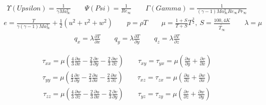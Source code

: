 \begin{align*}
\Upsilon (Upsilon)=\frac{1}{\gamma Ma_\infty^2}
\ \ \ \ \ \ \ \ \ 
\Psi (Psi)=\frac{1}{Re_\infty}
\ \ \ \ \ \ \ \ \ 
\Gamma (Gamma)=\frac{1}{\left(\gamma -1 \right)Ma_\infty^2 Re_\infty Pr_\infty}
\end{align*}
\begin{align*}
e=\frac{T}{\gamma \left(\gamma -1\right)Ma_\infty^2}+\frac{1}{2}\left(u^2+v^2+w^2\right)
\ \ \ \ \ \ \ \ \ 
p=\rho T
\ \ \ \ \ \ \ \ \ 
\mu=\frac{1+S}{T+S}T^\frac{3}{2},\ S=\frac{100,4K}{\tilde{T_\infty}}
\ \ \ \ \ \ \ \ \ 
\lambda=\mu
\end{align*}
\begin{align*}
q_x=\lambda \frac{\partial T}{\partial x}
\ \ \ \ \ \ \ \ \ 
q_y=\lambda \frac{\partial T}{\partial y}
\ \ \ \ \ \ \ \ \ 
q_z=\lambda \frac{\partial T}{\partial z}
\end{align*}

\begin{align*}
\tau_{xx}=\mu \left(\frac{4}{3}\frac{\partial u}{\partial x}-\frac{2}{3}\frac{\partial v}{\partial y}-\frac{2}{3}\frac{\partial w}{\partial z} \right)
\ \ \ \ \ \ \ \ \ 
\tau_{xy}=\tau_{yx}=\mu \left(\frac{\partial u}{\partial y}+\frac{\partial v}{\partial x} \right)
\end{align*}
\begin{align*}
\tau_{yy}=\mu \left(\frac{4}{3}\frac{\partial v}{\partial y}-\frac{2}{3}\frac{\partial u}{\partial x}-\frac{2}{3}\frac{\partial w}{\partial z} \right)
\ \ \ \ \ \ \ \ \ 
\tau_{xz}=\tau_{zx}=\mu \left(\frac{\partial u}{\partial z}+\frac{\partial w}{\partial x} \right)
\end{align*}
\begin{align*}
\tau_{zz}=\mu \left(\frac{4}{3}\frac{\partial w}{\partial z}-\frac{2}{3}\frac{\partial u}{\partial x}-\frac{2}{3}\frac{\partial v}{\partial y} \right)
\ \ \ \ \ \ \ \ \ 
\tau_{yz}=\tau_{zy}=\mu \left(\frac{\partial v}{\partial z}+\frac{\partial w}{\partial y} \right)
\end{align*}

